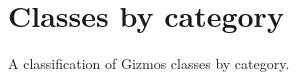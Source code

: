 \chapter{Classes by category}\label{classesbycat}
%
\setfooter{\thepage}{}{}{}{}{\thepage}%

A classification of Gizmos classes by category.
\twocolwidtha{5cm}

\begin{comment}
{\large {\bf Service classes}}

\overview{wxMPService class overview}{wxmpserviceoverview}

Service classes reduce the diversity of PMF classes, by making
them comply to a common interface. A service class serves as an interface (or
mix-in class in C++ terms), which cannot itself represent an
independent object. It should be inherited as a second (or
third) base class.

Derived services classes all derive from wxEvtHandler as well as
wxPMService.

\begin{twocollist}\itemsep=0pt
\twocolitem{\helpref{wxPMService}{wxpmservice}}{Base class}
\twocolitem{\helpref{wxPMBootstrapService}{wxpmbootstrapservice}}{Boot strap service}
\twocolitem{\helpref{wxPMLAlgorithm}{wxpmlalgorithm}}{Layout algorithm service}
\twocolitem{\helpref{wxPMSashLayoutAlgorithm}{wxpmsashlayoutalgorithm}}{Sash layout algorithm service}
\twocolitem{\helpref{wxPMPane}{wxpmpane}}{Base class for panes lying outside the MDI client area}
\end{twocollist}
\end{comment}

